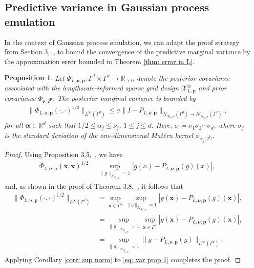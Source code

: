 \documentclass[pdflatex,sn-mathphys-num]{sn-jnl}%
\theoremstyle{thmstyleone}%
\newtheorem{proposition}{Proposition}%
\theoremstyle{thmstyletwo}%
\theoremstyle{thmstylethree}%
\begin{document}
\subsection{Predictive variance in Gaussian process emulation}\label{subsec: predictive variance}
In the context of Gaussian process emulation, we can adapt the proof strategy from Section 3,~\cite{Teckentrup2020}, to bound the convergence of the predictive marginal variance by the approximation error bounded in Theorem \ref{thm: error in L}.

\begin{proposition}\label{prop: vairance convergence}
Let \(\tilde\Phi_{L,\boldsymbol{\nu},\mathbf{p}}:\Gamma^d\times\Gamma^d\rightarrow\mathbb{R}_{>0}\) denote the posterior covariance associated with the lengthscale-informed sparse grid design \(\mathcal{X}^{\otimes}_{L,\mathbf{p}}\) and prior covariance \(\Phi_{\boldsymbol{\nu},2^{\mathbf{p}}}\). The posterior marginal variance is bounded by
\begin{align}
    \|\tilde\Phi_{L,\boldsymbol{\nu},\mathbf{p}}(\cdot,\cdot)^{1/2}\|_{L^{\infty}(\Gamma^d)} \leq \sigma\|I-P_{L,\boldsymbol{\nu},\mathbf{p}}\|_{\mathcal{N}_{\Phi_{\boldsymbol{\nu},2^{\mathbf{p}}}}(\Gamma^d)\rightarrow\mathcal{N}_{\Phi_{\boldsymbol{\alpha},2^{\mathbf{p}}}}(\Gamma^d)},\nonumber
\end{align}
for all \(\boldsymbol{\alpha}\in\mathbb{R}^d\) such that \(1/2\leq\alpha_j\leq\nu_j\), \(1\leq j\leq d\). Here, \(\sigma\coloneqq\sigma_1\sigma_2\cdots\sigma_d\), where \(\sigma_j\) is the standard deviation of the one-dimensional Mat\'ern kernel \(\phi_{\alpha_j,2^{p_j}}\).
\end{proposition}

\begin{proof}
    Using Proposition 3.5,~\cite{stuart_teckentrup_2018}, we have
    \begin{align}
        \tilde\Phi_{L,\boldsymbol{\nu},\mathbf{p}}(\mathbf{x},\mathbf{x})^{1/2} = \sup_{\|g\|_{\mathcal{N}_{\Phi_{\boldsymbol{\nu},2^\mathbf{p}}}}=1}|g(x)-P_{L,\boldsymbol{\nu},\mathbf{p}}(g)(x)|,\nonumber
    \end{align}
    and, as shown in the proof of Theorem 3.8,~\cite{Teckentrup2020}, it follows that
    \begin{align}
        \|\tilde\Phi_{L,\boldsymbol{\nu},\mathbf{p}}(\cdot,\cdot)^{1/2}\|_{L^\infty(\Gamma^d)}&=\sup_{\mathbf{x}\in\Gamma^d}\sup_{\|g\|_{\mathcal{N}_{\Phi_{\boldsymbol{\nu},2^\mathbf{p}}}}=1}|g(\mathbf{x})-P_{L,\boldsymbol{\nu},\mathbf{p}}(g)(\mathbf{x})|,\nonumber\\
        &=\sup_{\|g\|_{\mathcal{N}_{\Phi_{\boldsymbol{\nu},2^\mathbf{p}}}}=1}\sup_{\mathbf{x}\in\Gamma^d}|g(\mathbf{x})-P_{L,\boldsymbol{\nu},\mathbf{p}}(g)(\mathbf{x})|,\nonumber\\
        &=\sup_{\|g\|_{\mathcal{N}_{\Phi_{\boldsymbol{\nu},2^\mathbf{p}}}}=1}\|g-P_{L,\boldsymbol{\nu},\mathbf{p}}(g)\|_{L^\infty(\Gamma^d)}.\label{eq: var prop 1}
    \end{align}
    Applying Corollary \ref{corr: sup norm} to \eqref{eq: var prop 1} completes the proof.
\end{proof}
\end{document}
